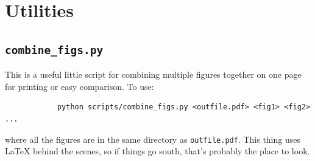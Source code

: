 \documentclass{article}
\newcommand{\code}{\lstinline}
\begin{document}
        \section{Utilities}
        \subsection{\code{combine_figs.py}}
        This is a useful little script for combining multiple figures together on one page for printing or easy comparison. To use:
        \begin{lstlisting}
            python scripts/combine_figs.py <outfile.pdf> <fig1> <fig2> ...
        \end{lstlisting}
        where all the figures are in the same directory as \code{outfile.pdf}. This thing uses LaTeX behind the scenes, so if things go south, that's probably the place to look.

    {}
    
\end{document}
